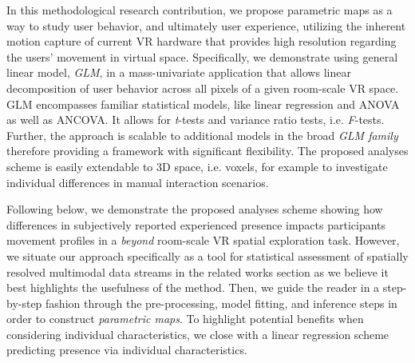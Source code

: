 In this methodological research contribution, we propose parametric maps as a way to study user behavior, and ultimately user experience, utilizing the inherent motion capture of current VR hardware that provides high resolution regarding the users' movement in virtual space. Specifically, we demonstrate using general linear model, \textit{GLM}, in a mass-univariate application that allows linear decomposition of user behavior across all pixels of a given room-scale VR space. GLM encompasses familiar statistical models, like linear regression and ANOVA as well as ANCOVA. It allows for \textit{t}-tests and variance ratio tests, i.e. \textit{F}-tests. Further, the approach is scalable to additional models in the broad \textit{GLM family} therefore providing a framework with significant flexibility. The proposed analyses scheme is easily extendable to 3D space, i.e. voxels, for example to investigate individual differences in manual interaction scenarios.

Following below, we demonstrate the proposed analyses scheme showing how differences in subjectively reported experienced presence impacts participants movement profiles in a \textit{beyond} room-scale VR spatial exploration task. However, we situate our approach specifically as a tool for statistical assessment of spatially resolved multimodal data streams in the related works section as we believe it best highlights the usefulness of the method. Then, we guide the reader in a step-by-step fashion through the pre-processing, model fitting, and inference steps in order to construct \textit{parametric maps}. To highlight potential benefits when considering individual characteristics, we close with a linear regression scheme predicting presence via individual characteristics.